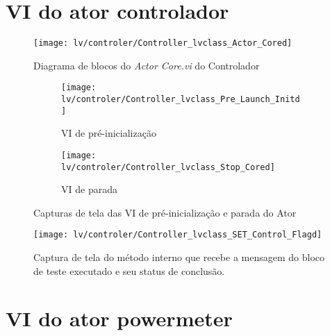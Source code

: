 \begin{comment}
        
        \begin{figure}
                \centering
                 \texttt{[image: lv/modcom/ModCOM\_tritestd]}
                \caption{Captura de tela da rotina de teste do sensor de presença das tensões trifásicas}
                \label{fig:modcomtri}
        \end{figure} 
    \end{comment}
    
\section{VI do ator controlador}

       \begin{figure}
                \centering
                \texttt{[image: lv/controler/Controller\_lvclass\_Actor\_Cored]}
                \caption{Diagrama de blocos do \textit{Actor Core.vi} do Controlador}
                \label{fig:cntrlcore}
        \end{figure}
          
        \begin{figure}
                \centering
                \begin{subfigure}[b]{0.45\textwidth}
                    \texttt{[image: lv/controler/Controller\_lvclass\_Pre\_Launch\_Initd]}
                    \caption{VI de pré-inicialização}
                \end{subfigure}
                \begin{subfigure}[b]{0.45\textwidth}
                    \texttt{[image: lv/controler/Controller\_lvclass\_Stop\_Cored]}
                    \caption{VI de parada}
                \end{subfigure}
                \caption{Capturas de tela das VI de pré-inicialização e parada do Ator}
                \label{fig:cntrlprestop}
        \end{figure}
        
        \begin{figure}
                \centering
                \texttt{[image: lv/controler/Controller\_lvclass\_SET\_Control\_Flagd]}
                \caption{Captura de tela do método interno que recebe a mensagem do bloco de teste executado e seu status de conclusão.}
                \label{fig:cntrlset}
        \end{figure}
        
\section{VI do ator powermeter}
 
